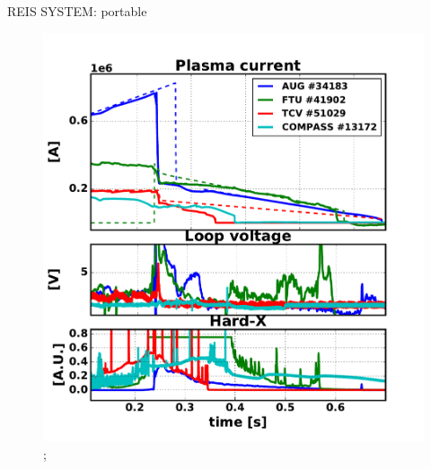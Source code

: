 \documentclass{beamer}
\begin{document}
\begin{frame}{REIS SYSTEM: portable}
    \begin{figure}
    \centering
    \includegraphics[width=0.6\linewidth]{Chapter2Fig/rebeam_comparison.pdf};
    \end{figure} 
\end{frame}
\end{document}
